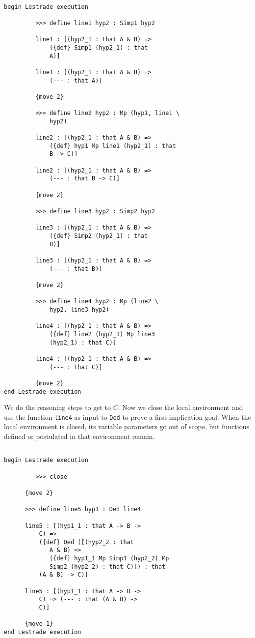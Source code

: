\documentclass[12pt]{article}
\begin{document}
\begin{verbatim}

begin Lestrade execution

         >>> define line1 hyp2 : Simp1 hyp2

         line1 : [(hyp2_1 : that A & B) => 
             ({def} Simp1 (hyp2_1) : that 
             A)]

         line1 : [(hyp2_1 : that A & B) => 
             (--- : that A)]

         {move 2}

         >>> define line2 hyp2 : Mp (hyp1, line1 \
             hyp2)

         line2 : [(hyp2_1 : that A & B) => 
             ({def} hyp1 Mp line1 (hyp2_1) : that 
             B -> C)]

         line2 : [(hyp2_1 : that A & B) => 
             (--- : that B -> C)]

         {move 2}

         >>> define line3 hyp2 : Simp2 hyp2

         line3 : [(hyp2_1 : that A & B) => 
             ({def} Simp2 (hyp2_1) : that 
             B)]

         line3 : [(hyp2_1 : that A & B) => 
             (--- : that B)]

         {move 2}

         >>> define line4 hyp2 : Mp (line2 \
             hyp2, line3 hyp2)

         line4 : [(hyp2_1 : that A & B) => 
             ({def} line2 (hyp2_1) Mp line3 
             (hyp2_1) : that C)]

         line4 : [(hyp2_1 : that A & B) => 
             (--- : that C)]

         {move 2}
end Lestrade execution

\end{verbatim}

We do the reasoning steps to get to $C$.  Now we close the local environment and use the function {\tt line4} as input
to {\tt Ded} to prove a first implication goal.  When the local environment is closed, its variable parameters go out of scope,
but functions defined or postulated in that environment remain.

\begin{verbatim}

begin Lestrade execution

         >>> close

      {move 2}

      >>> define line5 hyp1 : Ded line4

      line5 : [(hyp1_1 : that A -> B -> 
          C) => 
          ({def} Ded ([(hyp2_2 : that 
             A & B) => 
             ({def} hyp1_1 Mp Simp1 (hyp2_2) Mp 
             Simp2 (hyp2_2) : that C)]) : that 
          (A & B) -> C)]

      line5 : [(hyp1_1 : that A -> B -> 
          C) => (--- : that (A & B) -> 
          C)]

      {move 1}
end Lestrade execution

\end{verbatim}
\end{document}
